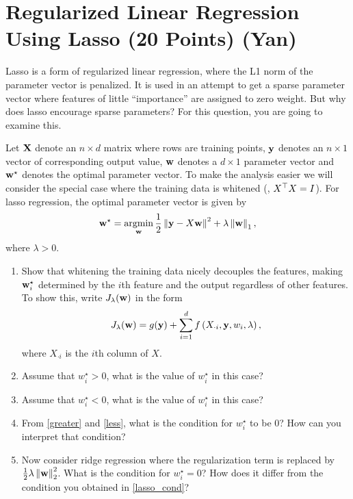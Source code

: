 \section{Regularized Linear Regression Using Lasso (20 Points) (Yan)}

Lasso is a form of regularized linear regression, where the L1 norm of the parameter vector is penalized. It is used in an attempt to get a sparse parameter vector where features of little ``importance'' are assigned to zero weight. But why does lasso encourage sparse parameters? For this question, you are going to examine this.

Let $\mathbf{X}$ denote an $n \times d$ matrix where rows are training points, $\mathbf{y}$ denotes an $n \times 1$ vector of corresponding output value, $\mathbf{w}$ denotes a $d \times 1$ parameter vector and $\mathbf{w}^\star$ denotes the optimal parameter vector. To make the analysis easier we will consider the special case where the training data is whitened (\ie, $X^\top X = I$). For lasso regression, the optimal parameter vector is given by
\begin{align}
\mathbf{w}^\star = \operatorname*{argmin}_{\mathbf{w}} \frac{1}{2} \left\| \mathbf{y} - X\mathbf{w} \right\|^2 + \lambda \left\| \mathbf{w} \right\|_1,
\end{align}
where $\lambda > 0$.

\begin{enumerate}
\item  Show that whitening the training data nicely decouples the features, making $\mathbf{w}_i^\star$ determined by the $i$th feature and the output regardless of other features. To show this, write $J_\lambda (\mathbf{w})$ in the form
\begin{align}
J_\lambda (\mathbf{w}) = g(\mathbf{y}) + \sum_{i=1}^d f\left(  X_{\cdot i}, \mathbf{y}, w_i, \lambda \right),
\end{align}
where $X_{\cdot i}$ is the $i$th column of $X$.

\item Assume that $w_i^\star > 0$, what is the value of $w_i^\star$ in this case? \label{greater}

\item Assume that $w_i^\star < 0$, what is the value of $w_i^\star$ in this case? \label{less}

\item From \ref{greater} and \ref{less}, what is the condition for $w_i^\star$ to be 0? How can you interpret that condition? \label{lasso_cond}

\item Now consider ridge regression where the regularization term is replaced by $\frac{1}{2}\lambda\left\| \mathbf{w} \right\|_2^2$. What is the condition for $w_i^\star = 0$? How does it differ from the condition you obtained in \ref{lasso_cond}?

\end{enumerate}

